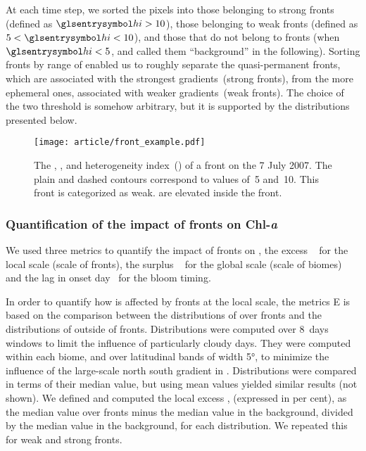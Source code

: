 At each time step, we sorted the pixels into those belonging to strong fronts (defined as \(\am{hi} > 10\)), those belonging to weak fronts (defined as \(5 < \am{hi} < 10\)), and those that do not belong to fronts (when \(\am{hi} < 5\), and called them ``background'' in the following).
Sorting fronts by range of  enabled us to roughly separate the quasi-permanent fronts, which are associated with the strongest  gradients~(strong fronts), from the more ephemeral ones, associated with weaker gradients~(weak fronts).
The choice of the two  threshold is somehow arbitrary, but it is supported by the  distributions presented below.


\begin{figure}
  \centering
  \texttt{[image: article/front\_example.pdf]}
  \caption[Example of front]{
    The , , and heterogeneity index~() of a front on the 7 July 2007.
    The plain and dashed contours correspond to  values of~5 and~10.
    This front is categorized as weak.
     are elevated inside the front.
  }%
  \label{fig:zoom}
\end{figure}

\subsubsection{Quantification of the impact of fronts on Chl-\emph{a}}

We used three metrics to quantify the impact of fronts on , the excess ~ for the local scale (scale of fronts), the surplus ~ for the global scale (scale of biomes) and the lag in onset day~ for the bloom timing.

In order to quantify how  is affected by fronts at the local scale, the metrics E is based on the comparison between the distributions of  over fronts and the distributions of  outside of fronts.
Distributions were computed over 8~days windows to limit the influence of particularly cloudy days.
They were computed within each biome, and over latitudinal bands of width \ang{5}, to minimize the influence of the large-scale north south gradient in .
Distributions were compared in terms of their median value, but using mean values yielded similar results (not shown).
We defined and computed the local excess ,  (expressed in per cent), as the median value over fronts minus the median value in the background, divided by the median value in the background, for each distribution.
We repeated this for weak and strong fronts.

